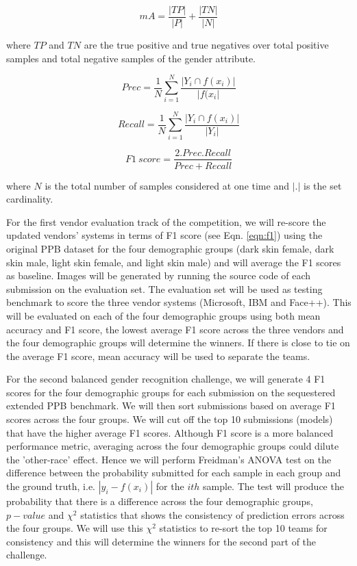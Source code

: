 \documentclass[11pt, oneside]{article}
\begin{document}
\begin{equation}
\label{eqn:ma}
mA =   \frac{|TP|}{|P|} + \frac{|TN|}{|N|} 
\end{equation}

where $TP$ and $TN$ are the true positive and true negatives over total positive samples and total negative samples of the gender attribute.

\begin{equation}
\label{eqn:prec}
Prec =  \frac{1}{N}  \sum_{i=1}^{N}   \frac{|Y_{i} \cap f(x_{i}) |}{|f(x_{i}|}
\end{equation}

\begin{equation}
\label{eqn:rec}
Recall =  \frac{1}{N}  \sum_{i=1}^{N}   \frac{|Y_{i} \cap f(x_{i}) |}{|Y_{i}|} 
\end{equation}

\begin{equation}
\label{eqn:f1}
F1\ score =  \frac{2.Prec.Recall}{Prec+Recall}
\end{equation}

where $N$ is the total number of samples considered at one time and $|.|$ is the set cardinality.

For the first vendor evaluation track of the competition, we will re-score the updated vendors' systems in terms of F1 score (see Eqn. \ref{eqn:f1}) using the original PPB dataset for the four demographic groups (dark skin female, dark skin male, light skin female, and light skin male) and will average the F1 scores as baseline. Images will be generated by running the source code of each submission on the evaluation set.  The evaluation set will be used as testing benchmark to score the three vendor systems (Microsoft, IBM and Face++).  This will be evaluated on each of the four demographic groups using both mean accuracy and F1 score, the lowest average F1 score across the three vendors and the four demographic groups will determine the winners. If there is close to tie on the average F1 score, mean accuracy will be used to separate the teams.

For the second balanced gender recognition challenge, we will generate 4 F1 scores for the four demographic groups for each submission on the sequestered extended PPB benchmark. We will then sort submissions based on average F1 scores across the four groups. We will cut off the top 10 submissions (models) that have the higher average F1 scores. Although F1 score is a more balanced performance metric, averaging across the four demographic groups could dilute the 'other-race' effect. Hence we will perform Freidman's ANOVA test on the difference between the probability submitted for each sample in each group and the ground truth, i.e. $|y_{i} - f(x_{i})|$ for the $ith$ sample. The test will produce the probability that there is a difference across the four demographic groups, $p-value$ and $\chi^{2}$ statistics that shows the consistency of prediction errors across the four groups. We will use this $\chi^{2}$ statistics to re-sort the top 10 teams for consistency and this will determine the winners for the second part of the challenge.
\end{document}
